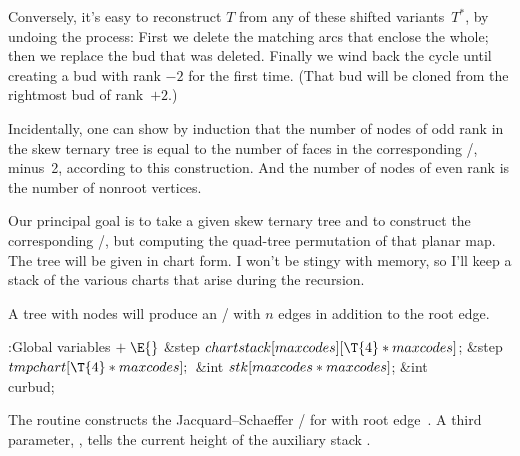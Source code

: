 Conversely, it's easy to reconstruct $T$ from any of these
shifted variants~$T^*$, by undoing the process: First we delete the
matching arcs that enclose the whole; then we replace the bud that
was deleted. Finally we wind back the cycle until creating a
bud with rank $-2$ for the first time. (That bud
will be cloned from the rightmost bud of rank~$+2$.)

Incidentally, one can show by induction that the number of nodes of odd rank
in the skew ternary tree is equal to the number of faces in the corresponding
\RNBPM/, minus~2, according to this construction.
And the number of nodes of even rank is the number of
nonroot vertices.

\fi

Our principal goal is to take a given skew
ternary tree and to
construct the corresponding \RNBPM/, but computing the quad-tree
permutation of that planar map. The tree will be given in
chart form. I won't be stingy with memory, so I'll keep a stack
of the various charts that arise during the recursion.

A tree with  nodes will produce an \RNBPM/ with $n$ edges
in addition to the root edge.

\Y\B\4:Global variables\X${}\mathrel+\E{}$\6
\&{step} ${}\\{chartstack}[\\{maxcodes}][\T{4}*\\{maxcodes}]{}$;\6
\&{step} ${}\\{tmpchart}[\T{4}*\\{maxcodes}];{}$\6
\&{int} ${}\\{stk}[\\{maxcodes}*\\{maxcodes}]{}$;\6
\&{int} \\{curbud};\par
\fi

 The  routine constructs the
Jacquard--Schaeffer
\RNBPM/ for 
with root edge~. A third parameter, , tells the current height
of the
auxiliary stack .

